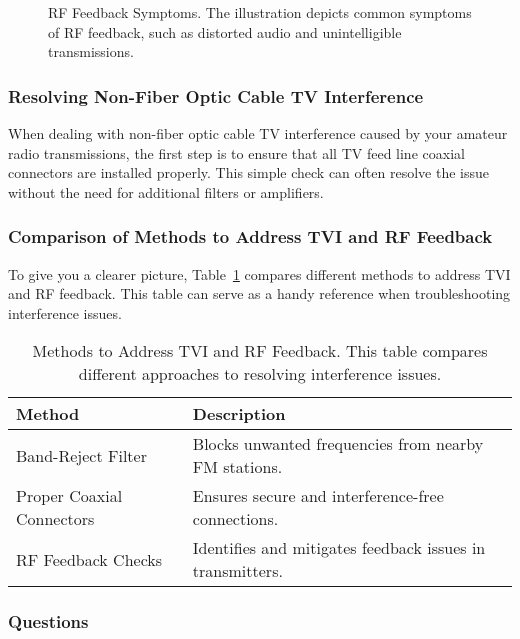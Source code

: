 \begin{figure}[h]
    \centering
    \caption{RF Feedback Symptoms. The illustration depicts common symptoms of RF feedback, such as distorted audio and unintelligible transmissions.}
    \label{fig:rf-feedback}
\end{figure}

\subsubsection*{Resolving Non-Fiber Optic Cable TV Interference}

When dealing with non-fiber optic cable TV interference caused by your amateur radio transmissions, the first step is to ensure that all TV feed line coaxial connectors are installed properly. This simple check can often resolve the issue without the need for additional filters or amplifiers.

\subsubsection*{Comparison of Methods to Address TVI and RF Feedback}

To give you a clearer picture, Table~\ref{tab:tvi-rf-feedback} compares different methods to address TVI and RF feedback. This table can serve as a handy reference when troubleshooting interference issues.

\begin{table}[h]
    \centering
    \begin{tabular}{|l|l|}
        \hline
        \textbf{Method} & \textbf{Description} \\
        \hline
        Band-Reject Filter & Blocks unwanted frequencies from nearby FM stations. \\
        Proper Coaxial Connectors & Ensures secure and interference-free connections. \\
        RF Feedback Checks & Identifies and mitigates feedback issues in transmitters. \\
        \hline
    \end{tabular}
    \caption{Methods to Address TVI and RF Feedback. This table compares different approaches to resolving interference issues.}
    \label{tab:tvi-rf-feedback}
\end{table}

\subsubsection*{Questions}

